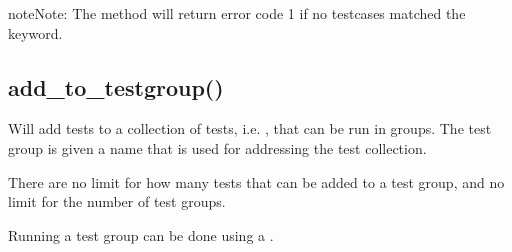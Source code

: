 \documentclass[letterpaper,10pt,english]{sphinxmanual}
\begin{document}
\begin{sphinxVerbatim}[commandchars=\\\{\}]
 

 

 

 
\end{sphinxVerbatim}

\begin{sphinxadmonition}{note}{Note:}
\sphinxAtStartPar
The {\hyperref[\detokenize{api:start}]{}} method will return error code 1 if no testcases matched the  keyword.
\end{sphinxadmonition}


\subsection{add\_to\_testgroup()}
\label{\detokenize{api:add-to-testgroup}}
\begin{DUlineblock}{0em}
\item[] Will add tests to a collection of tests, i.e. {\hyperref[\detokenize{intro:test-group}]{}}, that can be run in groups.
The test group is given a name that is used for addressing the test collection.
\item[] There are no limit for how many tests that can be added to a test group, and no limit for the number of test groups.
\item[] Running a test group can be done using a {\hyperref[\detokenize{cli::doc}]{}}.
\end{DUlineblock}
\end{document}
